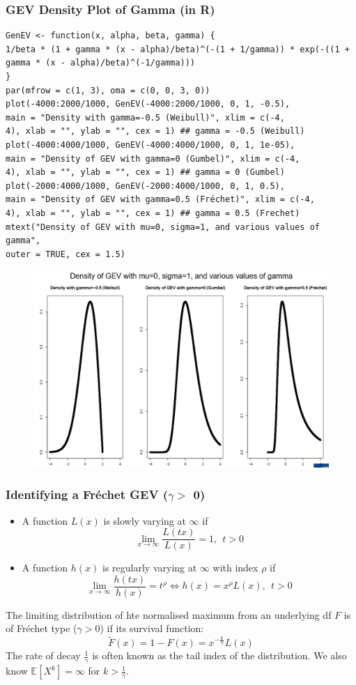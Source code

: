 \documentclass[11pt]{article}
\newcommand{\noi}{\noindent}
\begin{document}
\subsubsection{GEV Density Plot of Gamma (in R)}
\begin{lstlisting}
GenEV <- function(x, alpha, beta, gamma) {
1/beta * (1 + gamma * (x - alpha)/beta)^(-(1 + 1/gamma)) * exp(-((1 +
gamma * (x - alpha)/beta)^(-1/gamma)))
}
par(mfrow = c(1, 3), oma = c(0, 0, 3, 0))
plot(-4000:2000/1000, GenEV(-4000:2000/1000, 0, 1, -0.5),
main = "Density with gamma=-0.5 (Weibull)", xlim = c(-4,
4), xlab = "", ylab = "", cex = 1) ## gamma = -0.5 (Weibull)
plot(-4000:4000/1000, GenEV(-4000:4000/1000, 0, 1, 1e-05),
main = "Density of GEV with gamma=0 (Gumbel)", xlim = c(-4,
4), xlab = "", ylab = "", cex = 1) ## gamma = 0 (Gumbel)
plot(-2000:4000/1000, GenEV(-2000:4000/1000, 0, 1, 0.5),
main = "Density of GEV with gamma=0.5 (Fréchet)", xlim = c(-4,
4), xlab = "", ylab = "", cex = 1) ## gamma = 0.5 (Frechet)
mtext("Density of GEV with mu=0, sigma=1, and various values of gamma",
outer = TRUE, cex = 1.5)
\end{lstlisting}
\begin{figure}[H]
    \centering
    \includegraphics[width=0.6\linewidth]{Density of GEV Gamma.png}
\end{figure}

\subsubsection{Identifying a Fr\'echet GEV ($\gamma >$ 0)}
\begin{itemize}
    \item A function $L(x)$ is slowly varying at $\infty$ if
        $$\lim_{x\rightarrow\infty}\frac{L(tx)}{L(x)} = 1, \: \ t>0$$
    \item A function $h(x)$ is regularly varying at $\infty$ with index $\rho$ if
        $$\lim_{x\rightarrow\infty}\frac{h(tx)}{h(x)} = t^\rho \Leftrightarrow h(x) = x^\rho L(x), \: \ t > 0$$
\end{itemize}
\noi The limiting distribution of hte normalised maximum from an underlying df $F$ is of Fr\'echet type ($\gamma > 0$) if its survival function:
$$\tilde{F}(x) = 1 - F(x) = x^{\boldsymbol{-\frac{1}{\gamma}}}L(x)$$
\noi The rate of decay $\frac{1}{\gamma}$ is often known as the tail index of the distribution. We also know $\mathbb{E}[X^k] = \infty$ for $k > \frac{1}{\gamma}$. \\
\end{document}
